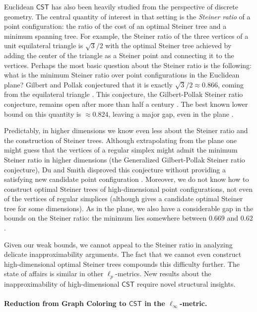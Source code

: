 \documentclass{theoretics}
\newcommand{\1}{\textbf{1}}
\newcommand{\cst}{$\mathsf{CST}$\xspace}
\begin{document}
Euclidean \cst has also been heavily studied from the perspective of discrete geometry. The central quantity of interest in that setting is the \textit{Steiner ratio} of a point configuration: the ratio of the cost of an optimal Steiner tree and a minimum spanning tree. For example, the Steiner ratio of the three vertices of a unit equilateral triangle is $\sqrt{3}/2$ with the optimal Steiner tree achieved by adding the center of the triangle as a Steiner point and connecting it to the vertices. Perhaps the most basic question about the Steiner ratio is the following: what is the minimum Steiner ratio over point configurations in the Euclidean plane? Gilbert and Pollak conjectured that it is exactly $\sqrt{3}/2 \approx 0.866$, coming from the equilateral triangle \cite{Gilbert_Pollak_1968}. This conjecture, the Gilbert-Pollak Steiner ratio conjecture, remains open after more than half a century \cite{ivanov2012steiner}. The best known lower bound on this quantity is $\approx 0.824$, leaving a major gap, even in the plane \cite{Chung_Graham_1985}. 

Predictably, in higher dimensions we know even less about the Steiner ratio and the construction of Steiner trees. Although extrapolating from the plane one might guess that the vertices of a regular simplex might admit the minimum Steiner ratio in higher dimensions (the Generalized Gilbert-Pollak Steiner ratio conjecture), Du and Smith disproved this conjecture without providing a satisfying new candidate point configuration \cite{Du_Smith_1996}. Moreover, we do not know how to construct optimal Steiner trees of high-dimensional point configurations, not even of the vertices of regular simplices (although \cite{Chung_Gilbert_1976} gives a candidate optimal Steiner tree for some dimensions). As in the plane, we also have a considerable gap in the bounds on the Steiner ratio: the minimum lies somewhere between $0.669$ and $0.62$ \cite{Chung_Gilbert_1976, Du_Smith_1996, Du_Wu_Lu_Xu_2011}. 

Given our weak bounds, we cannot appeal to the Steiner ratio in analyzing delicate inapproximability arguments. The fact that we cannot even construct high-dimensional optimal Steiner trees compounds this difficulty further. The state of affairs is similar in other $\ell_p$-metrics. New results about the inapproximability of high-dimensional \cst require novel structural insights.



\paragraph{\texorpdfstring{Reduction from Graph Coloring to \cst in the $\ell_{\infty}$-metric.}{Reduction from Graph Coloring to CST in the l_inf-metric.}}
\end{document}
